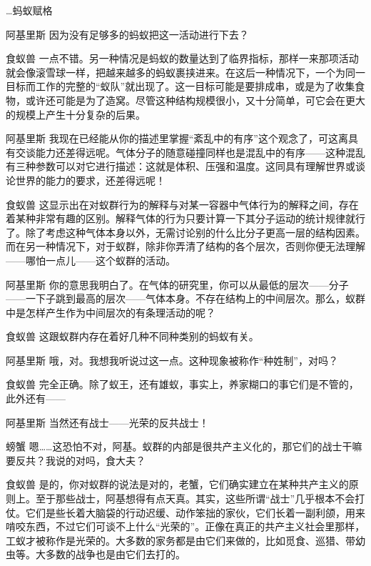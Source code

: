 \begin{dialog}{…蚂蚁赋格}
\begin{dialogue}
\item[阿基里斯]因为没有足够多的蚂蚁把这一活动进行下去？

\item[食蚁兽]一点不错。另一种情况是蚂蚁的数量达到了临界指标，那样一来那项活动就会像滚雪球一样，把越来越多的蚂蚁裹挟进来。在这后一种情况下，一个为同一目标而工作的完整的“蚁队”就出现了。这一目标可能是要排成串，或是为了收集食物，或许还可能是为了造窝。尽管这种结构规模很小，又十分简单，可它会在更大的规模上产生十分复杂的后果。

\item[阿基里斯]我现在已经能从你的描述里掌握“紊乱中的有序”这个观念了，可这离具有交谈能力还差得远呢。气体分子的随意碰撞同样也是混乱中的有序——这种混乱有三种参数可以对它进行描述：这就是体积、压强和温度。这同具有理解世界或谈论世界的能力的要求，还差得远呢！

\item[食蚁兽]这显示出在对蚁群行为的解释与对某一容器中气体行为的解释之间，存在着某种非常有趣的区别。解释气体的行为只要计算一下其分子运动的统计规律就行了。除了考虑这种气体本身以外，无需讨论别的什么比分子更高一层的结构因素。而在另一种情况下，对于蚁群，除非你弄清了结构的各个层次，否则你便无法理解——哪怕一点儿——这个蚁群的活动。

\item[阿基里斯]你的意思我明白了。在气体的研究里，你可以从最低的层次——分子——一下子跳到最高的层次——气体本身。不存在结构上的中间层次。那么，蚁群中是怎样产生作为中间层次的有条理活动的呢？

\item[食蚁兽]这跟蚁群内存在着好几种不同种类别的蚂蚁有关。

\item[阿基里斯]哦，对。我想我听说过这一点。这种现象被称作“种姓制”，对吗？

\item[食蚁兽]完全正确。除了蚁王，还有雄蚁，事实上，养家糊口的事它们是不管的，此外还有——

\item[阿基里斯]当然还有战士——光荣的反共战士！

\item[螃蟹]嗯……这恐怕不对，阿基。蚁群的内部是很共产主义化的，那它们的战士干嘛要反共？我说的对吗，食大夫？

\item[食蚁兽]是的，你对蚁群的说法是对的，老蟹，它们确实建立在某种共产主义的原则上。至于那些战士，阿基想得有点天真。其实，这些所谓“战士”几乎根本不会打仗。它们是些长着大脑袋的行动迟缓、动作笨拙的家伙，它们长着一副利颌，用来啃咬东西，不过它们可谈不上什么“光荣的”。正像在真正的共产主义社会里那样，工蚁才被称作是光荣的。大多数的家务都是由它们来做的，比如觅食、巡猎、带幼虫等。大多数的战争也是由它们去打的。


\end{dialogue}
\end{dialog}
